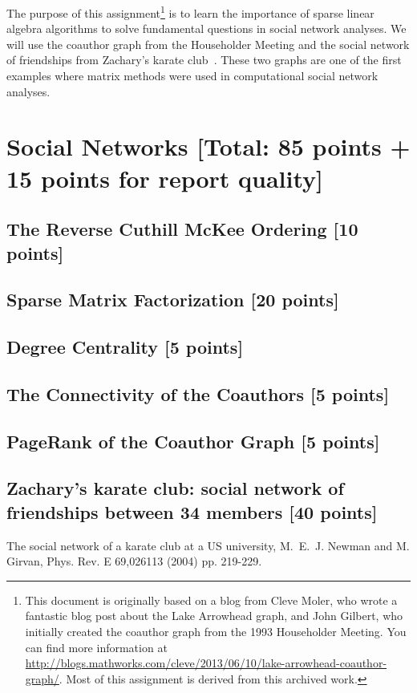 \documentclass[unicode,11pt,a4paper,oneside,numbers=endperiod,openany]{scrartcl}
\begin{document}
\setassignment
{}

\newline

\assignmentpolicy


The purpose of this assignment\footnote{This document is originally 
based on a blog from Cleve Moler, who wrote a fantastic blog post about the Lake Arrowhead graph, and John 
Gilbert, who initially created the coauthor graph from the 1993 Householder Meeting. You can find more information 
at \url{http://blogs.mathworks.com/cleve/2013/06/10/lake-arrowhead-coauthor-graph/}.  Most of this assignment is derived
from this archived work.} is to learn the importance of sparse linear algebra algorithms to solve fundamental 
questions in social network analyses.
We will use the coauthor graph from the Householder Meeting and the social network of friendships from Zachary's karate club~\cite{karate}.
These two graphs are one of the first examples where matrix methods were used in computational social network analyses.

\section*{Social Networks [Total: 85 points + 15 points for report quality]}

\subsection{The Reverse Cuthill McKee Ordering [10 points]}

\subsection{Sparse Matrix Factorization [20 points]}

\subsection{Degree Centrality [5 points]}

\subsection{The Connectivity of the Coauthors [5 points]}

\subsection{PageRank of the Coauthor Graph [5 points]}

\subsection{Zachary's karate club: social network of friendships between 34 members [40 points]}

\begin{thebibliography}{99}
 The social network of a karate club at a US university, M.~E.~J. Newman and M. Girvan, Phys. Rev. E 69,026113 (2004)
pp. 219-229.
\end{thebibliography}
\end{document}

